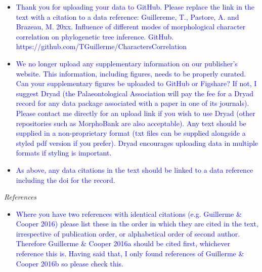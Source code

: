 \documentclass[12pt,letterpaper]{article}
\renewcommand{\subsection}[1]{%
\bigskip
\begin{center}
\begin{large}
\normalfont\itshape #1
\end{large}
\end{center}}
\begin{document}
\begin{itemize}
\item{\textcolor{blue}{Thank you for uploading your data to GitHub. Please replace the link in the text with a citation to a data reference: Guillereme, T., Pastore, A. and Brazeau, M. 20xx. Influence of different modes of morphological character correlation on phylogenetic tree inference. GitHub. https://github.com/TGuillerme/CharactersCorrelation}}

\item{\textcolor{blue}{We no longer upload any supplementary information on our publisher's website. This information, including figures, needs to be properly curated. Can your supplementary figures be uploaded to GitHub or Figshare? If not, I suggest Dryad (the Palaeontological Association will pay the fee for a Dryad record for any data package associated with a paper in one of its journals). Please contact me directly for an upload link if you wish to use Dryad (other repositories such as MorphoBank are also acceptable). Any text should be supplied in a non-proprietary format (txt files can be supplied alongside a styled pdf version if you prefer). Dryad encourages uploading data in multiple formats if styling is important.}}

\item{\textcolor{blue}{As above, any data citations in the text should be linked to a data reference including the doi for the record.}}
\end{itemize}

\subsection{References}
\begin{itemize}
\item{\textcolor{blue}{Where you have two references with identical citations (e.g. Guillerme \& Cooper 2016) please list these in the order in which they are cited in the text, irrespective of publication order, or alphabetical order of second author. Therefore Guillerme \& Cooper 2016a should be cited first, whichever reference this is. Having said that, I only found references of Guillerme \& Cooper 2016b so please check this.}}
\end{itemize}
\end{document}
